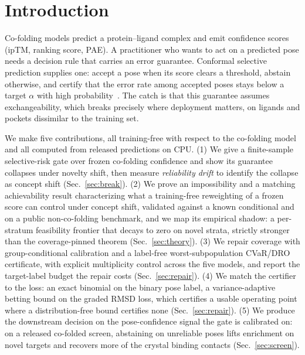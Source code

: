 \documentclass[10pt]{article}
\begin{document}
\section{Introduction}
Co-folding models predict a protein--ligand complex and emit confidence scores (ipTM,
ranking score, PAE). A practitioner who wants to act on a predicted pose needs a decision
rule that carries an error guarantee. Conformal selective prediction supplies one:
accept a pose when its score clears a threshold, abstain otherwise, and certify that the error
rate among accepted poses stays below a target $\alpha$ with high probability~\citep{vovk2005,geifman2017}. The catch is
that this guarantee assumes exchangeability, which breaks precisely where deployment matters,
on ligands and pockets dissimilar to the training set.

We make five contributions, all training-free with respect to the co-folding model and all
computed from released predictions on CPU. (1) We give a finite-sample selective-risk gate
over frozen co-folding confidence and show its guarantee collapses under novelty shift, then
measure \emph{reliability drift} to identify the collapse as concept shift (Sec.~\ref{sec:break}).
(2) We prove an impossibility and a matching achievability result characterizing what a
training-free reweighting of a frozen score can control under concept shift, validated against a
known conditional and on a public non-co-folding benchmark, and we map its empirical shadow: a
per-stratum feasibility frontier that decays to zero on novel strata, strictly stronger than the
coverage-pinned theorem (Sec.~\ref{sec:theory}). (3) We repair coverage with group-conditional
calibration and a label-free worst-subpopulation CVaR/DRO certificate, with explicit multiplicity
control across the five models, and report the target-label budget the repair costs
(Sec.~\ref{sec:repair}). (4) We match the certifier to the loss: an exact binomial on the binary
pose label, a variance-adaptive betting bound on the graded RMSD loss, which certifies a usable
operating point where a distribution-free bound certifies none (Sec.~\ref{sec:repair}).
(5) We produce the downstream decision on the pose-confidence signal the gate is calibrated on: on a
released co-folded screen, abstaining on unreliable poses lifts enrichment on novel targets and
recovers more of the crystal binding contacts (Sec.~\ref{sec:screen}).
\end{document}
